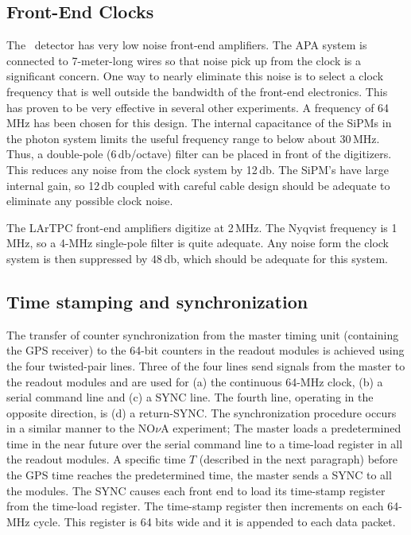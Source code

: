 \subsection{Front-End Clocks}

The \LBNE\ detector has very low noise front-end amplifiers.  The APA
system is connected to 7-meter-long wires so that noise pick up from the
clock is a significant concern.  One way to nearly eliminate this noise is
to select a clock frequency that is well outside the bandwidth of the
front-end electronics.  This has proven to be very effective in
several other experiments.  A frequency of 64\,MHz has been chosen for this design.
The internal capacitance of the SiPMs in the photon system limits the
useful frequency range to 
below about 30\,MHz.  Thus, a double-pole (6\,db/octave) filter
can be placed in front of the digitizers. This reduces any noise from the clock
system by 12\,db.  The SiPM's have large internal gain, so 12\,db
coupled with careful cable design should be adequate to eliminate any
possible clock noise.

The LArTPC front-end amplifiers digitize at 2\,MHz.  The Nyqvist
frequency is 1 MHz, so a 4-MHz single-pole filter is quite adequate.
Any noise form the clock system is then suppressed by 48\,db, which
should be adequate for this system.

\subsection{Time stamping and synchronization}

The transfer of counter synchronization from the master timing unit (containing the
GPS receiver) to the 64-bit counters in the readout modules is achieved
using the four twisted-pair lines.  Three of the four lines send
signals from the master to the readout modules and are used for (a)
the continuous 64-MHz clock, (b) a serial command line and (c) a SYNC
line. The fourth line, operating in the opposite direction, is (d) a
return-SYNC.  The synchronization procedure occurs in a similar manner
to the NO$\nu$A experiment; The master loads a predetermined time in the
near future over the serial command line to a time-load register in
all the readout modules.  A specific time $T$ (described in the next paragraph)
before the GPS time reaches the predetermined time, the master sends a
SYNC to all the modules.  The SYNC causes each front end to load its
time-stamp register from the time-load register.  The time-stamp
register then increments on each 64-MHz cycle.  This register is 64
bits wide and it is appended to each data packet.

